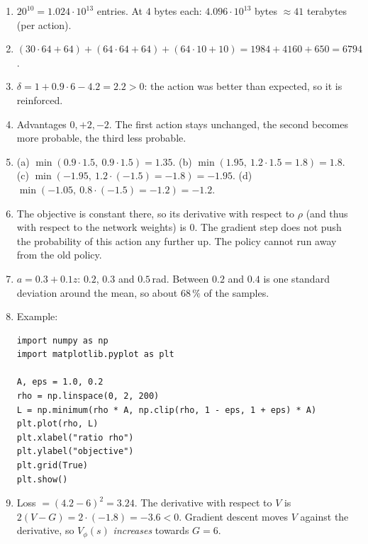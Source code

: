 \begin{enumerate}[label=\textbf{\ansnum.\arabic*}]
  \item $20^{10}=1.024\cdot10^{13}$ entries. At $4$ bytes each: $4.096\cdot10^{13}$ bytes $\approx41$ terabytes (per action).
  \item $(30\cdot64+64)+(64\cdot64+64)+(64\cdot10+10)=1984+4160+650=6794$.
  \item $\delta=1+0.9\cdot6-4.2=2.2>0$: the action was better than expected, so it is reinforced.
  \item Advantages $0,+2,-2$. The first action stays unchanged, the second becomes more probable, the third less probable.
  \item (a) $\min(0.9\cdot1.5,\ 0.9\cdot1.5)=1.35$. (b) $\min(1.95,\ 1.2\cdot1.5=1.8)=1.8$. (c) $\min(-1.95,\ 1.2\cdot(-1.5)=-1.8)=-1.95$. (d) $\min(-1.05,\ 0.8\cdot(-1.5)=-1.2)=-1.2$.
  \item The objective is constant there, so its derivative with respect to $\rho$ (and thus with respect to the network weights) is $0$. The gradient step does not push the probability of this action any further up. The policy cannot run away from the old policy.
  \item $a=0.3+0.1z$: $0.2$, $0.3$ and $0.5$\,rad. Between $0.2$ and $0.4$ is one standard deviation around the mean, so about $68\,\%$ of the samples.
  \item Example:
\begin{verbatim}
import numpy as np
import matplotlib.pyplot as plt

A, eps = 1.0, 0.2
rho = np.linspace(0, 2, 200)
L = np.minimum(rho * A, np.clip(rho, 1 - eps, 1 + eps) * A)
plt.plot(rho, L)
plt.xlabel("ratio rho")
plt.ylabel("objective")
plt.grid(True)
plt.show()
\end{verbatim}
  \item[\textbf{\ansnum.9}] Loss $=(4.2-6)^2=3.24$. The derivative with respect to $V$ is $2(V-G)=2\cdot(-1.8)=-3.6<0$. Gradient descent moves $V$ against the derivative, so $V_\phi(s)$ \emph{increases} towards $G=6$.
\end{enumerate}
